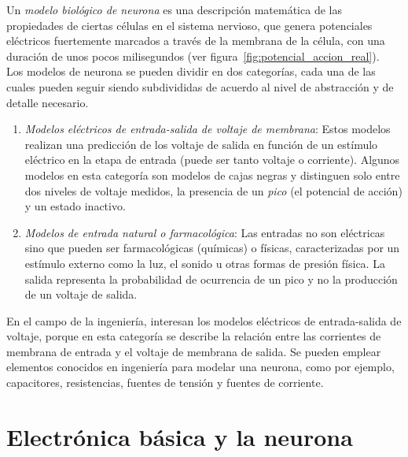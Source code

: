 Un \textit{modelo biológico de neurona} es una descripción matemática de las propiedades de ciertas células en el sistema nervioso, que genera potenciales eléctricos fuertemente marcados a través de la membrana de la célula, con una duración de unos pocos milisegundos (ver figura~\ref{fig:potencial_accion_real}).\\
Los modelos de neurona se pueden dividir en dos categorías, cada una de las cuales pueden seguir siendo subdivididas de acuerdo al nivel de abstracción y de detalle necesario.
\begin{enumerate}
    \item \emph{Modelos eléctricos de entrada-salida de voltaje de membrana}: Estos modelos realizan una predicción de los voltaje de salida en función de un estímulo eléctrico en la etapa de entrada (puede ser tanto voltaje o corriente). Algunos modelos en esta categoría son modelos de cajas negras y distinguen solo entre dos niveles de voltaje medidos, la presencia de un \textit{pico} (el potencial de acción) y un estado inactivo.
    \item \emph{Modelos de entrada natural o farmacológica}: Las entradas no son eléctricas sino que pueden ser farmacológicas (químicas) o físicas, caracterizadas por un estímulo externo como la luz, el sonido u otras formas de presión física. La salida representa la probabilidad de ocurrencia de un pico y no la producción de un voltaje de salida.
\end{enumerate}
En el campo de la ingeniería, interesan los modelos eléctricos de entrada-salida de voltaje, porque en esta categoría se describe la relación entre las corrientes de membrana de entrada y el voltaje de membrana de salida. Se pueden emplear elementos conocidos en ingeniería para modelar una neurona, como por ejemplo, capacitores, resistencias, fuentes de tensión y fuentes de corriente.
\newpage
\section{Electrónica básica y la neurona}
